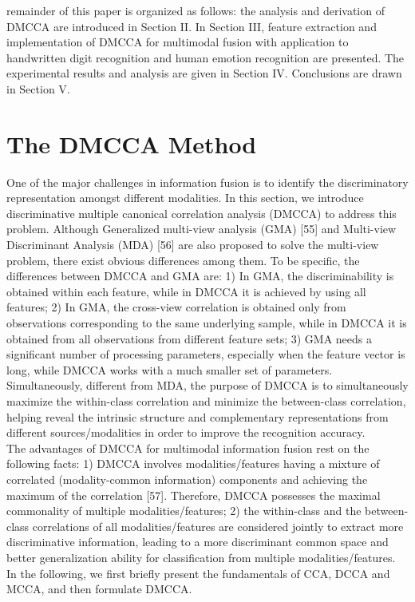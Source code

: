 \documentclass[journal]{IEEEtran}
\begin{document}
remainder of this paper is organized as follows: the analysis and derivation of DMCCA are introduced in Section II. In Section III, feature extraction and implementation of DMCCA for multimodal fusion with application to handwritten digit recognition and human emotion recognition are presented. The experimental results and analysis are given in Section IV. Conclusions are drawn in Section V.
\section{The DMCCA Method}
One of the major challenges in information fusion is to identify the discriminatory representation amongst different modalities. In this section, we introduce discriminative multiple canonical correlation analysis (DMCCA) to address this problem. Although Generalized multi-view analysis (GMA) [55] and Multi-view Discriminant Analysis (MDA) [56] are also proposed to solve the multi-view problem, there exist obvious differences among them. To be specific, the differences between DMCCA and GMA are: 1) In GMA, the discriminability is obtained within each feature, while in DMCCA it is achieved by using all features; 2) In GMA, the cross-view correlation is obtained only from observations corresponding to the same underlying sample, while in DMCCA it is obtained from all observations from different feature sets; 3) GMA needs a significant number of processing parameters, especially when the feature vector is long, while DMCCA works with a much smaller set of parameters. \\\indent Simultaneously, different from MDA, the purpose of DMCCA is to simultaneously maximize the within-class correlation and minimize the between-class correlation, helping reveal the intrinsic structure and complementary representations from different sources/modalities in order to improve the recognition accuracy. \\\indent The advantages of DMCCA for multimodal information fusion rest on the following facts: 1) DMCCA involves modalities/features having a mixture of correlated (modality-common information) components and achieving the maximum of the correlation [57]. Therefore, DMCCA possesses the maximal commonality of multiple modalities/features; 2) the within-class and the between-class correlations of all modalities/features are considered jointly to extract more discriminative information, leading to a more discriminant common space and better generalization ability for classification from multiple modalities/features. In the following, we first briefly present the fundamentals of CCA, DCCA and MCCA, and then formulate DMCCA.
\end{document}
